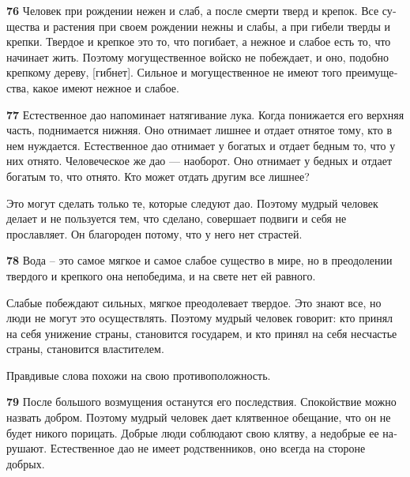 \documentclass[a4paper]{article}
\begin{document}
{\ttfamily
\foreignlanguage{russian}{\textrm{\textbf{76}}}\foreignlanguage{russian}{\textrm{ Человек при рождении нежен и слаб, а
после смерти тверд и крепок. Все существа и растения при своем рождении нежны и слабы, а при гибели тверды и крепки.
Твердое и крепкое это то, что погибает, а нежное и слабое есть то, что начинает жить. Поэтому могущественное войско не
побеждает, и оно, подобно крепкому дереву, [гибнет]. Сильное и могущественное не имеют того преимущества, какое имеют
нежное и слабое.}}}

{\ttfamily
\foreignlanguage{russian}{\textrm{\textbf{77}}}\foreignlanguage{russian}{\textrm{ Естественное дао напоминает
натягивание лука. Когда понижается его верхняя часть, поднимается нижняя. Оно отнимает лишнее и отдает отнятое тому,
кто в нем нуждается. Естественное дао отнимает у богатых и отдает бедным то, что у них отнято. Человеческое же дао —
наоборот. Оно отнимает у бедных и отдает богатым то, что отнято. Кто может отдать другим все лишнее?}}}

{
Это могут сделать только те, которые следуют дао. Поэтому мудрый человек делает и не пользуется тем, что сделано,
совершает подвиги и себя не прославляет. Он благороден потому, что у него нет страстей.}

{\ttfamily
\foreignlanguage{russian}{\textrm{\textbf{78}}}\foreignlanguage{russian}{\textrm{ Вода – это самое мягкое и самое слабое
существо в мире, но в преодолении твердого и крепкого она непобедима, и на свете нет ей равного.}}}

{
Слабые побеждают сильных, мягкое преодолевает твердое. Это знают все, но люди не могут это осуществлять. Поэтому мудрый
человек говорит: кто принял на себя унижение страны, становится государем, и кто принял на себя несчастье страны,
становится властителем.}

{
Правдивые слова похожи на свою противоположность.}


\bigskip

{\ttfamily
\foreignlanguage{russian}{\textrm{\textbf{79}}}\foreignlanguage{russian}{\textrm{ После большого возмущения останутся
его последствия. Спокойствие можно назвать добром. Поэтому мудрый человек дает клятвенное обещание, что он не будет
никого порицать. Добрые люди соблюдают свою клятву, а недобрые ее нарушают. Естественное дао не имеет родственников,
оно всегда на стороне добрых.}}}
\end{document}

